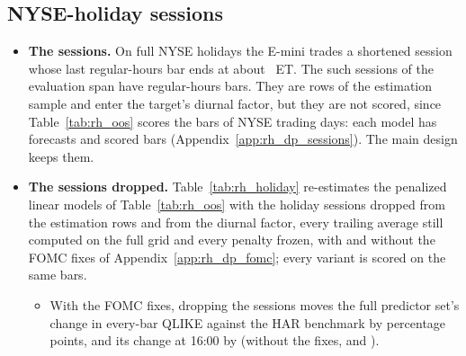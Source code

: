 \subsection{NYSE-holiday sessions}
\label{app:rh_robust_holiday}
\begin{itemize}
%
\item \textbf{The sessions.} On full NYSE holidays the E-mini trades a shortened session whose last regular-hours
  bar ends at about \rhholLastBar~ET. The \rhholNSessions{} such sessions of the evaluation span have \rhholNBars{}
  regular-hours bars. They are rows of the estimation sample and enter the target's diurnal factor, but they are not
  scored, since Table~\ref{tab:rh_oos} scores the bars of NYSE trading days: each model has \rhholNForecast{}
  forecasts and \rhholNScored{} scored bars (Appendix~\ref{app:rh_dp_sessions}). The main design keeps them.
\item \textbf{The sessions dropped.} Table~\ref{tab:rh_holiday} re-estimates the penalized linear models of
  Table~\ref{tab:rh_oos} with the holiday sessions dropped from the estimation rows and from the diurnal factor,
  every trailing average still computed on the full grid and every penalty frozen, with and without the FOMC fixes
  of Appendix~\ref{app:rh_dp_fomc}; every variant is scored on the same bars.
  \begin{itemize}
  \item With the FOMC fixes, dropping the sessions moves the full predictor set's change in every-bar QLIKE against
    the HAR benchmark by \rhholEffDBBarPpRng{} percentage points, and its change at 16:00 by
    \rhholEffDBClosePpRng{} (without the fixes, \rhholEffCABarPpRng{} and \rhholEffCAClosePpRng).

\end{itemize}
\end{itemize}
